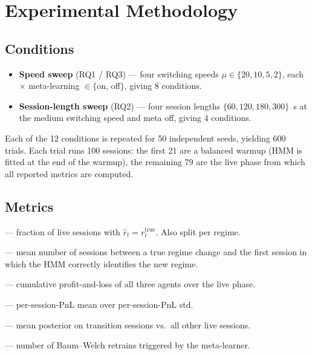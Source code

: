 \documentclass[11pt,a4paper]{article}
\begin{document}
\section{Experimental Methodology}\label{sec:method}

\subsection{Conditions}
\begin{itemize}[leftmargin=0.7cm,itemsep=0.1ex]
    \item \textbf{Speed sweep} (RQ1 / RQ3) --- four switching speeds
    $\mu\in\{20,10,5,2\}$, each $\times$ meta-learning $\in\{$on, off$\}$,
    giving 8 conditions.
    \item \textbf{Session-length sweep} (RQ2) --- four session lengths
    $\{60, 120, 180, 300\}$~s at the medium switching speed and meta off,
    giving 4 conditions.
\end{itemize}
Each of the 12 conditions is repeated for 50 independent seeds, yielding
$600$ trials. Each trial runs 100 sessions: the first 21 are a balanced
warmup (HMM is fitted at the end of the warmup), the remaining 79 are the
live phase from which all reported metrics are computed.

\subsection{Metrics}
\begin{description}[leftmargin=0.6cm,style=nextline,itemsep=0.2ex]
    \item[HMM accuracy] --- fraction of live sessions with
    $\hat{r}_t = r_t^{\text{true}}$. Also split per regime.
    \item[Detection lag] --- mean number of sessions between a true regime
    change and the first session in which the HMM correctly identifies the
    new regime.
    \item[Total PnL] --- cumulative profit-and-loss of all three agents
    over the live phase.
    \item[Sharpe] --- per-session-PnL mean over per-session-PnL std.
    \item[Confidence at transition vs.\ stable] --- mean posterior on
    transition sessions vs.\ all other live sessions.
    \item[Retrains per run] --- number of Baum--Welch retrains triggered by
    the meta-learner.
\end{description}
\end{document}
